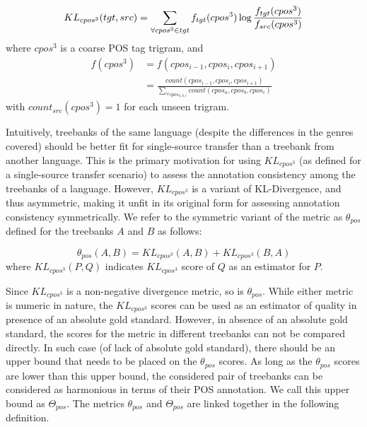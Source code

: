 \begin{definition}
\label{def:klcpos3}

\textbf{ }\\

\begin{equation}
\label{eqn:klcpos3}
\small KL_{cpos^3}(tgt, src) = \sum_{\forall cpos^3 \in tgt}^{}f_{tgt}(cpos^3)\log\frac{f_{tgt}(cpos^3)}{f_{src}(cpos^3)}
\end{equation}
where $cpos^3$ is a coarse POS tag trigram, and \\

\begin{align}
\label{eqn:cpos}
f(cpos^3) & = \nonumber f(cpos_{i-1}, cpos_{i}, cpos_{i+1}) \\ &= \frac{count(cpos_{i-1}, cpos_{i}, cpos_{i+1})}{\sum_{\forall cpos_{a,b,c}}{count(cpos_{a}, cpos_{b}, cpos_{c})}}
\end{align}
with $count_{src}(cpos^3) = 1$ for each unseen trigram.

\end{definition}

Intuitively, treebanks of the same language (despite the differences in the genres covered) should be better fit for single-source transfer than a treebank from another language. This is the primary motivation for using $KL_{cpos^3}$ (as defined for a single-source transfer scenario) to assess the annotation consistency among the treebanks of a language. However, $KL_{cpos^3}$ is a variant of KL-Divergence, and thus asymmetric, making it unfit in its original form for assessing annotation consistency symmetrically. We refer to the symmetric variant of the metric as $\theta_{pos}$ defined for the treebanks $A$ and $B$ as follows:

\begin{equation}
    \boxed{\theta_{pos}(A, B) = KL_{cpos^3}(A,B) + KL_{cpos^3}(B,A)}
\end{equation}
where $KL_{cpos^3}(P,Q)$ indicates $KL_{cpos^3}$ score of $Q$ as an estimator for $P$.

Since $KL_{cpos^3}$ is a non-negative divergence metric, so is $\theta_{pos}$. While either metric is numeric in nature, the $KL_{cpos^3}$ scores can be used as an estimator of quality in presence of an absolute gold standard. However, in absence of an absolute gold standard, the scores for the metric in different treebanks can not be compared directly. In such case (of lack of absolute gold standard), there should be an upper bound that needs to be placed on the $\theta_{pos}$ scores. As long as the $\theta_{pos}$ scores are lower than this upper bound, the considered pair of treebanks can be considered as harmonious in terms of their POS annotation. We call this upper bound as $\Theta_{pos}$. The metrics $\theta_{pos}$ and $\Theta_{pos}$ are linked together in the following definition.

